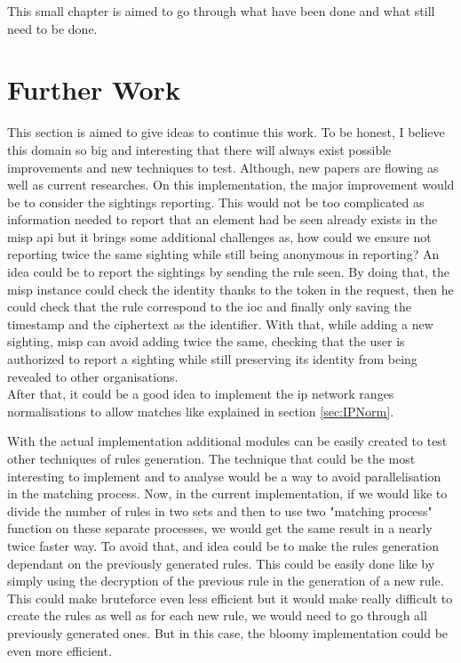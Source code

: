 \documentclass{eplmastersthesis}
\begin{document}
This small chapter is aimed to go through what have been done and what still need to be done.

\section{Further Work}
This section is aimed to give ideas to continue this work. To be honest, I believe this domain so big and interesting that there will always exist possible improvements and new techniques to test. Although, new papers are flowing as well as current researches.
On this implementation, the major improvement would be to consider the sightings reporting. This would not be too complicated as information needed to report that an element had be seen already exists in the \gls{misp} \gls{api} but it brings some additional challenges as, how could we ensure not reporting twice the same sighting while still being anonymous in reporting?
An idea could be to report the sightings by sending the rule seen. By doing that, the \gls{misp} instance could check the identity thanks to the token in the request, then he could check that the rule correspond to the \gls{ioc} and finally only saving the timestamp and the ciphertext as the identifier.
With that, while adding a new sighting, \gls{misp} can avoid adding twice the same, checking that the user is authorized to report a sighting while still preserving its identity from being revealed to other organisations.\\

After that, it could be a good idea to implement the \gls{ip} network ranges normalisations to allow matches like explained in section \ref{sec:IPNorm}.

With the actual implementation additional modules can be easily created to test other techniques of rules generation. The technique that could be the most interesting to implement and to analyse would be a way to avoid parallelisation in the matching process.
Now, in the current implementation, if we would like to divide the number of rules in two sets and then to use two "matching process" function on these separate processes, we would get the same result in a nearly twice faster way. To avoid that, and idea could be to make the rules generation dependant on the previously generated rules. This could be easily done like by simply using the decryption of the previous rule in the generation of a new rule.
This could make bruteforce even less efficient but it would make really difficult to create the rules as well as for each new rule, we would need to go through all previously generated ones.
But in this case, the bloomy implementation could be even more efficient.\\
\end{document}
